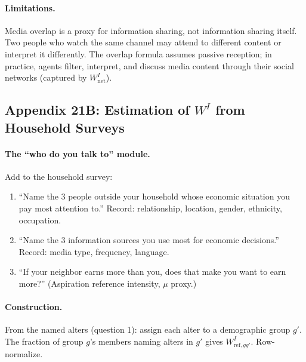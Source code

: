 \documentclass[../structural_economics_book.tex]{subfiles}
\begin{document}
\paragraph{Limitations.} Media overlap is a proxy for information sharing, not information sharing itself. Two people who watch the same channel may attend to different content or interpret it differently. The overlap formula assumes passive reception; in practice, agents filter, interpret, and discuss media content through their social networks (captured by $W^I_{\text{net}}$).


\subsection*{Appendix 21B: Estimation of $W^I$ from Household Surveys}
\label{ch21:app:survey}

\paragraph{The ``who do you talk to'' module.} Add to the household survey:
\begin{enumerate}
\item ``Name the 3 people outside your household whose economic situation you pay most attention to.'' Record: relationship, location, gender, ethnicity, occupation.
\item ``Name the 3 information sources you use most for economic decisions.'' Record: media type, frequency, language.
\item ``If your neighbor earns more than you, does that make you want to earn more?'' (Aspiration reference intensity, $\mu$ proxy.)
\end{enumerate}

\paragraph{Construction.} From the named alters (question 1): assign each alter to a demographic group $g'$. The fraction of group $g$'s members naming alters in $g'$ gives $W^I_{\text{ref}, gg'}$. Row-normalize.
\end{document}
